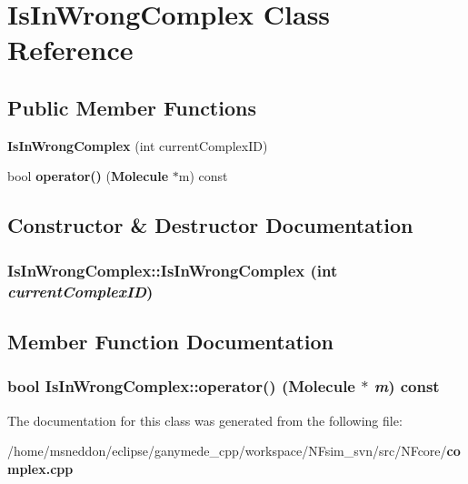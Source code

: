 \section{IsInWrongComplex Class Reference}
\label{classIsInWrongComplex}
\subsection*{Public Member Functions}
\begin{CompactItemize}
\item 
{\bf IsInWrongComplex} (int currentComplexID)
\item 
bool {\bf operator()} ({\bf Molecule} $\ast$m) const 
\end{CompactItemize}


\subsection{Constructor \& Destructor Documentation}
\subsubsection{\setlength{\rightskip}{0pt plus 5cm}IsInWrongComplex::IsInWrongComplex (int {\em currentComplexID})\hspace{0.3cm}{\tt  [inline]}}\label{classIsInWrongComplex_8ffb7d3c8b148441f1ec3b4bd23362af}




\subsection{Member Function Documentation}
\subsubsection{\setlength{\rightskip}{0pt plus 5cm}bool IsInWrongComplex::operator() ({\bf Molecule} $\ast$ {\em m}) const\hspace{0.3cm}{\tt  [inline]}}\label{classIsInWrongComplex_38f0096d82bcfc84bb3b1290fcd6241a}




The documentation for this class was generated from the following file:\begin{CompactItemize}
\item 
/home/msneddon/eclipse/ganymede\_\-cpp/workspace/NFsim\_\-svn/src/NFcore/{\bf complex.cpp}\end{CompactItemize}
